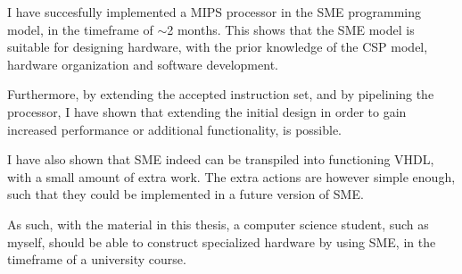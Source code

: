 I have succesfully implemented a MIPS processor in the SME programming model,
in the timeframe of $\sim$2 months. This shows that the SME model is
suitable for designing hardware, with the prior knowledge of the CSP model,
hardware organization and software development.

Furthermore, by extending the accepted instruction set, and by pipelining the
processor, I have shown that extending the initial design in order to gain
increased performance or additional functionality, is possible.

I have also shown that SME indeed can be transpiled into functioning VHDL, with
a small amount of extra work. The extra actions are however simple enough, such
that they could be implemented in a future version of SME.

As such, with the material in this thesis, a computer science student, such as
myself, should be able to construct specialized hardware by using SME, in the
timeframe of a university course.

